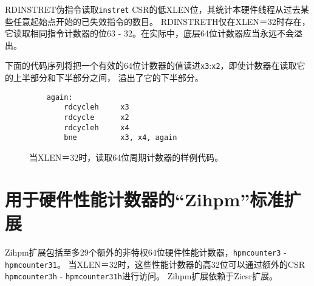 RDINSTRET伪指令读取{\tt instret} CSR的低XLEN位，其统计本硬件线程从过去某些任意起始点开始的已失效指令的数目。
RDINSTRETH仅在XLEN＝32时存在，它读取相同指令计数器的位63 - 32。在实际中，底层64位计数器应当永远不会溢出。


下面的代码序列将把一个有效的64位计数器的值读进{\tt x3}:{\tt x2}，即使计数器在读取它的上半部分和下半部分之间，
溢出了它的下半部分。

\begin{figure}[h!]
\begin{center}
\begin{verbatim}
    again:
        rdcycleh     x3
        rdcycle      x2
        rdcycleh     x4
        bne          x3, x4, again
\end{verbatim}
\end{center}
\caption{当XLEN＝32时，读取64位周期计数器的样例代码。  
}
\label{rdcycle}
\end{figure}

\section{用于硬件性能计数器的“Zihpm”标准扩展}

Zihpm扩展包括至多29个额外的非特权64位硬件性能计数器，{\tt hpmcounter3} - {\tt hpmcounter31}。
当XLEN＝32时，这些性能计数器的高32位可以通过额外的CSR {\tt hpmcounter3h} - {\tt hpmcounter31h}进行访问。
Zihpm扩展依赖于Zicsr扩展。

